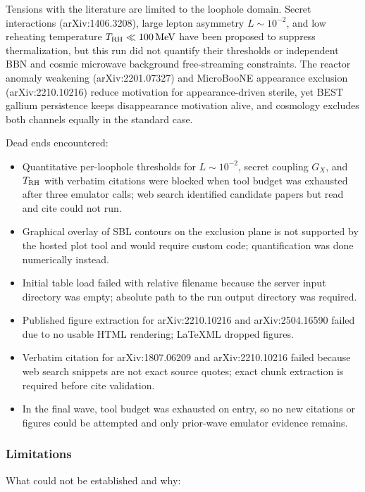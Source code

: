 \documentclass[11pt,a4paper]{article}
\begin{document}
Tensions with the literature are limited to the loophole domain. Secret interactions (arXiv:1406.3208), large lepton asymmetry $L \sim 10^{-2}$, and low reheating temperature $T_{\rm RH} \ll 100\,\mathrm{MeV}$ have been proposed to suppress thermalization, but this run did not quantify their thresholds or independent BBN and cosmic microwave background free-streaming constraints. The reactor anomaly weakening (arXiv:2201.07327) and MicroBooNE appearance exclusion (arXiv:2210.10216) reduce motivation for appearance-driven sterile, yet BEST gallium persistence keeps disappearance motivation alive, and cosmology excludes both channels equally in the standard case.

Dead ends encountered:

\begin{itemize}
  \item Quantitative per-loophole thresholds for $L \sim 10^{-2}$, secret coupling $G_X$, and $T_{\rm RH}$ with verbatim citations were blocked when tool budget was exhausted after three emulator calls; web search identified candidate papers but read and cite could not run.
  \item Graphical overlay of SBL contours on the exclusion plane is not supported by the hosted plot tool and would require custom code; quantification was done numerically instead.
  \item Initial table load failed with relative filename because the server input directory was empty; absolute path to the run output directory was required.
  \item Published figure extraction for arXiv:2210.10216 and arXiv:2504.16590 failed due to no usable HTML rendering; LaTeXML dropped figures.
  \item Verbatim citation for arXiv:1807.06209 and arXiv:2210.10216 failed because web search snippets are not exact source quotes; exact chunk extraction is required before cite validation.
  \item In the final wave, tool budget was exhausted on entry, so no new citations or figures could be attempted and only prior-wave emulator evidence remains.
\end{itemize}
\subsubsection*{Limitations}
What could not be established and why:
\end{document}
